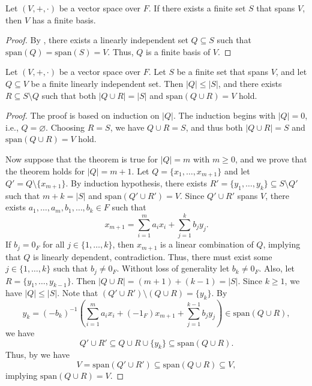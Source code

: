 \begin{theorem}\label{thm:finite-basis-existence}
  Let $(V, +, \cdot)$ be a vector space over $F$.
  If there exists a finite set $S$ that spans $V$,
  then $V$ has a finite basis.
\end{theorem}
\begin{proof}
  By , there exists
  a linearly independent set $Q \subseteq S$
  such that $\mathrm{span}(Q) = \mathrm{span}(S) = V$.
  Thus, $Q$ is a finite basis of $V$.
\end{proof}

\begin{theorem}\label{thm:replacement}
  Let $(V, +, \cdot)$ be a vector space over $F$.
  Let $S$ be a finite set that spans $V$,
  and let $Q \subseteq V$ be a finite linearly independent set.
  Then $|Q| \leq |S|$, and there exists $R \subseteq S \setminus Q$ such that
  both $|Q \cup R| = |S|$ and $\mathrm{span}(Q \cup R) = V$ hold.
\end{theorem}
\begin{proof}
  The proof is based on induction on $|Q|$.
  The induction begins with $|Q| = 0$, i.e., $Q = \varnothing$.
  Choosing $R = S$, we have $Q \cup R = S$, and thus
  both $|Q \cup R| = S$ and $\mathrm{span}(Q \cup R) = V$ hold.

  Now suppose that the theorem is true for $|Q| = m$ with $m \geq 0$,
  and we prove that the theorem holds for $|Q|= m + 1$.
  Let $Q = \{x_1, \dots, x_{m+1}\}$ and let $Q' = Q \setminus \{x_{m+1}\}$.
  By induction hypothesis, there exists
  $R' = \{y_1, \dots, y_k\} \subseteq S \setminus Q'$
  such that $m + k = |S|$ and $\mathrm{span}(Q' \cup R') = V$.
  Since $Q' \cup R'$ spans $V$, there exists
  $a_1, \dots, a_m, b_1, \dots, b_k \in F$ such that
  \begin{equation*}
    x_{m+1} = \sum_{i=1}^m a_ix_i + \sum_{j=1}^k b_jy_j.
  \end{equation*}
  If $b_j = 0_F$ for all $j \in \{1, \dots, k\}$, then $x_{m+1}$ is a linear
  combination of $Q$, implying that $Q$ is linearly dependent, contradiction.
  Thus, there must exist some $j \in \{1, \dots, k\}$
  such that $b_j \neq 0_F$.
  Without loss of generality let $b_k \neq 0_F$.
  Also, let $R = \{y_1, \dots, y_{k-1}\}$.
  Then $|Q \cup R| = (m+1) + (k-1) = |S|$.
  Since $k \geq 1$, we have $|Q| \leq |S|$.
  Note that $(Q' \cup R') \setminus (Q \cup R) = \{y_k\}$.
  By
  \begin{equation*}
    y_k = (-b_k)^{-1}\left(
       \sum_{i=1}^m a_ix_i + (-1_F)x_{m+1} + \sum_{j=1}^{k-1} b_jy_j
    \right) \in \mathrm{span}(Q \cup R),
  \end{equation*}
  we have
  \begin{equation*}
    Q' \cup R'
      \subseteq Q \cup R \cup \{y_k\}
      \subseteq \mathrm{span}(Q \cup R).
  \end{equation*}
  Thus, by  we have
  \begin{equation*}
    V = \mathrm{span}(Q' \cup R')
      \subseteq \mathrm{span}(Q \cup R)
      \subseteq V,
  \end{equation*}
  implying $\mathrm{span}(Q \cup R) = V$.
\end{proof}

